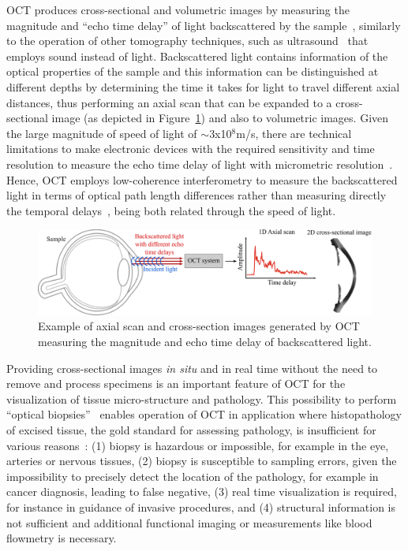 OCT produces cross-sectional and volumetric images by measuring the magnitude and ``echo time delay'' of light backscattered by the sample~\cite{Huang1991_Optical}, similarly to the operation of other tomography techniques, such as ultrasound~\cite{Hoskins2019_Diagnostic} that employs sound instead of light. Backscattered light contains information of the optical properties of the sample and this information can be distinguished at different depths by determining the time it takes for light to travel different axial distances, thus performing an axial scan that can be expanded to a cross-sectional image (as depicted in Figure~\ref{fig:BasicOCT}) and also to volumetric images. Given the large magnitude of speed of light of $\sim$3x10$^8$m/s, there are technical limitations to make electronic devices with the required sensitivity and time resolution to measure the echo time delay of light with micrometric resolution~\cite{Fujimoto2015_Introduction}. Hence, OCT employs low-coherence interferometry to measure the backscattered light in terms of optical path length differences rather than measuring directly the temporal delays~\cite{Huang1991_Optical}, being both related through the speed of light.

\begin{figure}
    \centering
    \includegraphics[width=\textwidth]{Figures/Introduction/BasicOCT.pdf}
    \caption{Example of axial scan and cross-section images generated by OCT measuring the magnitude and echo time delay of backscattered light.}
    \label{fig:BasicOCT}
\end{figure}

Providing cross-sectional images \textit{in situ} and in real time without the need to remove and process specimens is an important feature of OCT for the visualization of tissue micro-structure and pathology. This possibility to perform ``optical biopsies''~\cite{Fujimoto1995_Optical} enables operation of OCT in application where histopathology of excised tissue, the gold standard for assessing pathology, is insufficient for various reasons~\cite{Fujimoto2015_Introduction}: (1) biopsy is hazardous or impossible, for example in the eye, arteries or nervous tissues, (2) biopsy is susceptible to sampling errors, given the impossibility to precisely detect the location of the pathology, for example in cancer diagnosis, leading to false negative, (3) real time visualization is required, for instance in guidance of invasive procedures, and (4) structural information is not sufficient and additional functional imaging or measurements like blood flowmetry is necessary.

